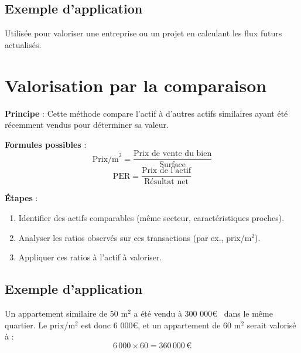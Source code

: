 \documentclass[a4paper, 12pt]{report}
\begin{document}
\subsection{Exemple d'application}

Utilisée pour valoriser une entreprise ou un projet en calculant les flux futurs actualisés.
	
\section{Valorisation par la comparaison}

	\textbf{Principe} : Cette méthode compare l’actif à d’autres actifs similaires ayant été récemment vendus pour déterminer sa valeur.  
	
	\textbf{Formules possibles} :  
	\[
	\text{Prix/m}^2 = \frac{\text{Prix de vente du bien}}{\text{Surface}}
	\]  
	\[
	\text{PER} = \frac{\text{Prix de l’actif}}{\text{Résultat net}}
	\]
	
	\textbf{Étapes} :  
	\begin{enumerate}
		\item Identifier des actifs comparables (même secteur, caractéristiques proches).
		\item Analyser les ratios observés sur ces transactions (par ex., prix/m\( ^2 \)).
		\item Appliquer ces ratios à l’actif à valoriser.
	\end{enumerate}
	
\subsection{Exemple d'application} 

	Un appartement similaire de 50 m\( ^2 \) a été vendu à 300 000\euro~ dans le même quartier. Le prix/m\( ^2 \) est donc 6 000\euro, et un appartement de 60 m\( ^2 \) serait valorisé à :  
	\[
	6\,000 \times 60 = 360\,000\,€
	\]
	
\end{document}
